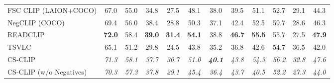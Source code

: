 \begin{table}[t]
\begin{adjustbox}{max width=\textwidth}
\begin{tabular}{p{5.0cm}ccccccccccc}
    FSC CLIP (LAION+COCO) & 67.0 & 55.0 & 34.8 & 27.5 & 48.1 & 38.0 & 39.5 & 51.1 & 52.7 & 29.1 & 44.3 \\
    NegCLIP (COCO) & 69.4 & 56.0 & 38.4 & 28.8 & 50.3 & 37.1 & 42.4 & 52.5 & 59.7 & 28.6 & 46.3 \\
    READCLIP & \textbf{72.0} & 58.4 & \textbf{39.0} & \textbf{31.4} & \textbf{54.1} & 38.8 & \textbf{46.7} & \textbf{55.5} & 55.7 & 27.5 & \textbf{47.9} \\
    TSVLC & 65.1 & 51.2 & 29.8 & 24.5 & 43.8 & 35.2 & 36.8 & 42.6 & 54.7 & 36.5 & 42.0 \\
    \midrule
    CS-CLIP & \emph{71.3} & \emph{58.1} & \emph{37.7} & \emph{30.7} & \emph{51.0} & \textbf{\emph{40.1}} & \emph{43.8} & \emph{54.3} & \emph{56.2} & \emph{32.8} & \emph{47.6} \\
    CS-CLIP (w/o Negatives) & \emph{70.3} & \emph{57.3} & \emph{37.8} & \emph{29.1} & \emph{45.4} & \emph{36.4} & \emph{43.7} & \emph{40.5} & \emph{52.2} & \emph{27.3} & \emph{44.0} \\
    \bottomrule
  \end{tabular}
  \end{adjustbox}
\end{table}

